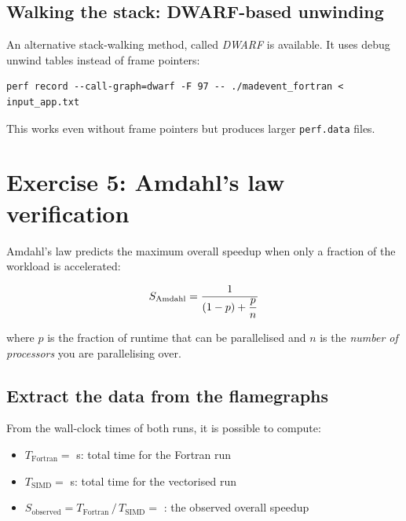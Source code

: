 \documentclass[11pt,a4paper]{article}
\begin{document}
\subsection{Walking the stack: DWARF-based unwinding}

An alternative stack-walking method, called \emph{DWARF} is available.
It uses debug unwind tables instead of frame pointers:
\begin{lstlisting}[style=bashstyle]
perf record --call-graph=dwarf -F 97 -- ./madevent_fortran < input_app.txt
\end{lstlisting}
This works even without frame pointers but produces larger \texttt{perf.data} files.

\section{Exercise 5: Amdahl's law verification}
\label{sec:amdahl}

Amdahl's law predicts the maximum overall speedup when only a fraction of the workload is accelerated:

\begin{equation}
    S_\textup{Amdahl} = \frac{1}{(1 - p) + \dfrac{p}{n}}
    \label{eq:amdahl}
\end{equation}

where $p$ is the fraction of runtime that can be parallelised and $n$ is the \emph{number of processors} you are parallelising over.

\subsection{Extract the data from the flamegraphs}

From the wall-clock times of both runs, it is possible to compute:
\begin{itemize}[nosep]
    \item $T_{\text{Fortran}} =$ \TextField[name=time_fortran_summary, width=1.5cm]{} s: total time for the Fortran run
    \item $T_{\text{SIMD}} =$ \TextField[name=time_cpp_summary, width=1.5cm]{} s: total time for the vectorised run
    \item $S_{\text{observed}} = T_{\text{Fortran}} \,/\, T_{\text{SIMD}} =$ \TextField[name=speedup, width=1.5cm]{}: the observed overall speedup
\end{itemize}
\end{document}
